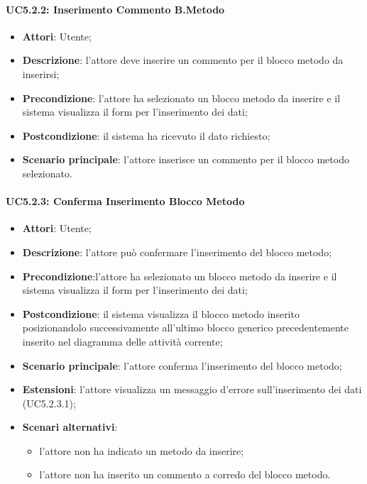 \paragraph{UC5.2.2: Inserimento Commento B.Metodo}
\label{UC5.2.2}
\begin{itemize}
\item \textbf{Attori}: Utente;
\item \textbf{Descrizione}: l'attore deve inserire un commento per il blocco metodo da inserirsi;	
\item \textbf{Precondizione}: l'attore ha selezionato un blocco metodo da inserire e il sistema visualizza il form per l'inserimento dei dati;	
\item \textbf{Postcondizione}: il sistema ha ricevuto il dato richiesto;	
\item \textbf{Scenario principale}:
l'attore inserisce un commento per il blocco metodo selezionato.
\end{itemize}

\paragraph{UC5.2.3: Conferma Inserimento Blocco Metodo}
\label{UC5.2.3}
\begin{itemize}
\item \textbf{Attori}: Utente;
\item \textbf{Descrizione}: l'attore può confermare l'inserimento del blocco metodo;	
\item \textbf{Precondizione}:l'attore ha selezionato un blocco metodo da inserire e il sistema visualizza il form per l'inserimento dei dati;	
\item \textbf{Postcondizione}: il sistema visualizza il blocco metodo inserito posizionandolo successivamente all'ultimo blocco generico precedentemente inserito nel diagramma delle attività corrente;		
\item \textbf{Scenario principale}:
l'attore conferma l'inserimento del blocco metodo;	
\item \textbf{Estensioni}:
l'attore visualizza un messaggio d'errore sull'inserimento dei dati (UC5.2.3.1);	
\item \textbf{Scenari alternativi}:
\begin{itemize}
\item l'attore non ha indicato un metodo da inserire;
\item l'attore non ha inserito un commento a corredo del blocco metodo.
\end{itemize}
\end{itemize}

